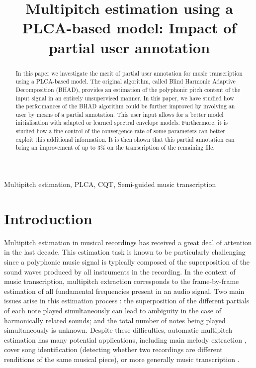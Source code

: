\documentclass{article}
\title{Multipitch estimation using a PLCA-based model: Impact of partial user annotation} %
\begin{document}
\ninept
%
\maketitle
%
\begin{abstract}
In this paper we investigate the merit of partial user annotation for music transcription using a PLCA-based model. The original algorithm, called Blind Harmonic Adaptive Decomposition (BHAD), provides an estimation of the polyphonic pitch content of the input signal in an entirely unsupervised manner. In this paper, we have studied how the performances of the BHAD algorithm could be further improved by involving an user by means of a partial annotation. This user input allows for a better model initialisation with adapted or learned spectral envelope models. Furthermore, it is studied how a fine control of the convergence rate of some parameters can better exploit this additional information. It is then shown that this partial annotation can bring an improvement of up to 3\% on the transcription of the remaining file.  
\end{abstract}
%
\begin{keywords}
Multipitch estimation, PLCA, CQT, Semi-guided music transcription
\end{keywords}
%

\vspace{0.4cm}

\section{Introduction}
\label{sec:intro}

Multipitch estimation in musical recordings has received a great deal of attention in the last decade. This estimation task is known to be particularly challenging since a polyphonic music signal is typically composed of the
superposition of the sound waves produced by all instruments in the recording. In the context of music transcription, 
multipitch extraction corresponds to the frame-by-frame estimation of all fundamental frequencies present in an audio signal. 
Two main issues arise in this estimation process : 
the superposition of the different partials of each note played simultaneously can lead to ambiguity in the case of harmonically related sounds; and the total number of notes being played simultaneously is unknown.  
Despite these difficulties, automatic multipitch estimation has many potential applications, including main melody extraction \cite{JS:SigMag2014, Durrieu2011, toosMelodyICASSP10}, cover song identification \cite{salamonVersionIDQBH-MMIR13} (detecting whether two recordings are different renditions of the same musical piece), or more generally music transcription \cite{HainsworthPhD}.
\end{document}
